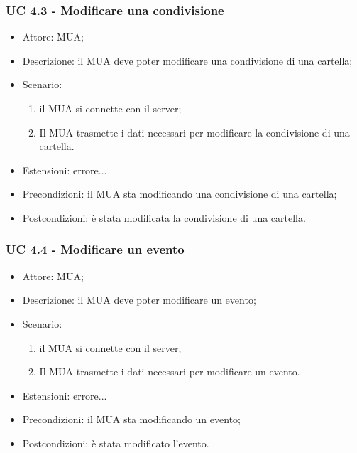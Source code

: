     \subsubsection{UC 4.3 - Modificare una condivisione} \label{sec: UC 4.3}
    \begin{itemize}
        \item Attore: MUA;
        \item Descrizione: il MUA deve poter modificare una condivisione di una cartella;
        \item Scenario:
        \begin{enumerate}
        \item il MUA si connette con il server;
        \item Il MUA trasmette i dati necessari per modificare la condivisione di una cartella.
        \end{enumerate}
        \item Estensioni: errore...
        \item Precondizioni: il MUA sta modificando una condivisione di una cartella;
        \item Postcondizioni: è stata modificata la condivisione di una cartella.
    \end{itemize}

    \subsubsection{UC 4.4 - Modificare un evento} \label{sec: UC 4.4}
    \begin{itemize}
        \item Attore: MUA;
        \item Descrizione: il MUA deve poter modificare un evento;
        \item Scenario:
        \begin{enumerate}
        \item il MUA si connette con il server;
        \item Il MUA trasmette i dati necessari per modificare un evento.
        \end{enumerate}
        \item Estensioni: errore...
        \item Precondizioni: il MUA sta modificando un evento;
        \item Postcondizioni: è stata modificato l'evento.
    \end{itemize}


